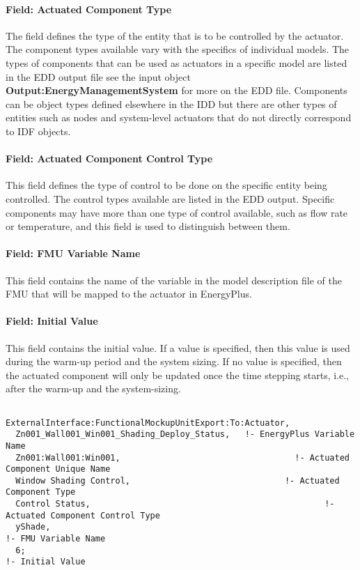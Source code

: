 \paragraph{Field: Actuated Component Type}\label{field-actuated-component-type-2}

The field defines the type of the entity that is to be controlled by the actuator. The component types available vary with the specifics of individual models. The types of components that can be used as actuators in a specific model are listed in the EDD output file see the input object \textbf{Output:EnergyManagementSystem} for more on the EDD file. Components can be object types defined elsewhere in the IDD but there are other types of entities such as nodes and system-level actuators that do not directly correspond to IDF objects.

\paragraph{Field: Actuated Component Control Type}\label{field-actuated-component-control-type-2}

This field defines the type of control to be done on the specific entity being controlled. The control types available are listed in the EDD output. Specific components may have more than one type of control available, such as flow rate or temperature, and this field is used to distinguish between them.

\paragraph{Field: FMU Variable Name}\label{field-fmu-variable-name-6}

This field contains the name of the variable in the model description file of the FMU that will be mapped to the actuator in EnergyPlus.

\paragraph{Field: Initial Value}\label{field-initial-value-7}

This field contains the initial value. If a value is specified, then this value is used during the warm-up period and the system sizing. If no value is specified, then the actuated component will only be updated once the time stepping starts, i.e., after the warm-up and the system-sizing.

\begin{lstlisting}

ExternalInterface:FunctionalMockupUnitExport:To:Actuator,
  Zn001_Wall001_Win001_Shading_Deploy_Status,   !- EnergyPlus Variable Name
  Zn001:Wall001:Win001,                                   !- Actuated Component Unique Name
  Window Shading Control,                               !- Actuated Component Type
  Control Status,                                               !- Actuated Component Control Type
  yShade,                                                               !- FMU Variable Name
  6;                                                                         !- Initial Value
\end{lstlisting}

